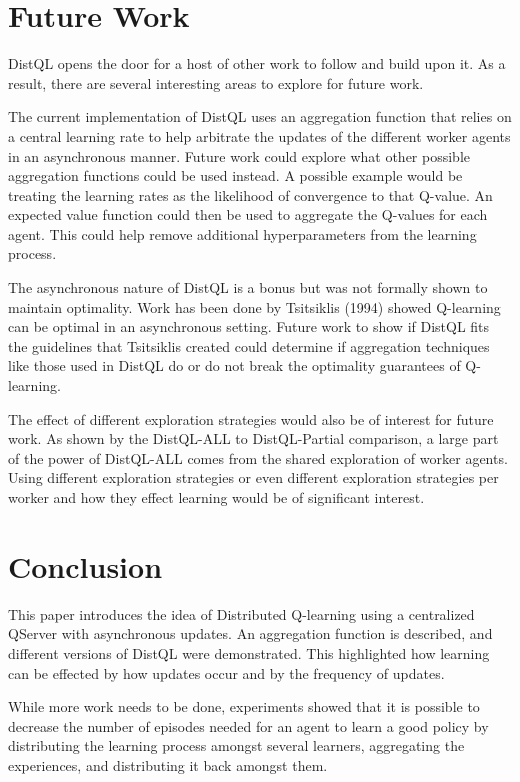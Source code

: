 \documentclass[jair,twoside,11pt,theapa]{article}
\begin{document}

\section{Future Work}
\label{future}
DistQL opens the door for a host of other work to follow and build upon it. As a result, there are several interesting areas to explore for future work. 

The current implementation of DistQL uses an aggregation function that relies on a central learning rate to help arbitrate the updates of the different worker agents in an asynchronous manner. Future work could explore what other possible aggregation functions could be used instead. A possible example would be treating the learning rates as the likelihood of convergence to that Q-value. An expected value function could then be used to aggregate the Q-values for each agent. This could help remove additional hyperparameters from the learning process.

The asynchronous nature of DistQL is a bonus but was not formally shown to maintain optimality. Work has been done by Tsitsiklis (1994) \nocite{Tsitsiklis1994} showed Q-learning can be optimal in an asynchronous setting. Future work to show if DistQL fits the guidelines that Tsitsiklis created could determine if aggregation techniques like those used in DistQL do or do not break the optimality guarantees of Q-learning. 

The effect of different exploration strategies would also be of interest for future work. As shown by the DistQL-ALL to DistQL-Partial comparison, a large part of the power of DistQL-ALL comes from the shared exploration of worker agents. Using different exploration strategies or even different exploration strategies per worker and how they effect learning would be of significant interest. 

\section{Conclusion}
\label{conclusion}
This paper introduces the idea of Distributed Q-learning using a centralized QServer with asynchronous updates. An aggregation function is described, and different versions of DistQL were demonstrated. This highlighted how learning can be effected by how updates occur and by the frequency of updates. 

While more work needs to be done, experiments showed that it is possible to decrease the number of episodes needed for an agent to learn a good policy by distributing the learning process amongst several learners, aggregating the experiences, and distributing it back amongst them.

\vskip 0.2in


\end{document}
